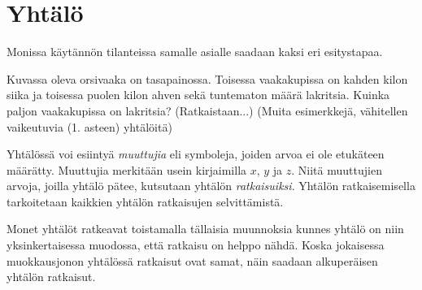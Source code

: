 \chapter{Yhtälö}
Monissa käytännön tilanteissa samalle asialle saadaan kaksi eri esitystapaa.

\begin{esimerkki}
Kuvassa oleva orsivaaka on tasapainossa. Toisessa vaakakupissa on kahden kilon siika ja toisessa puolen kilon ahven sekä tuntematon määrä lakritsia. Kuinka paljon vaakakupissa on lakritsia? (Ratkaistaan...) (Muita esimerkkejä, vähitellen vaikeutuvia (1. asteen) yhtälöitä)
\end{esimerkki}



Yhtälössä voi esiintyä \emph{muuttujia} eli symboleja, joiden arvoa ei ole etukäteen määrätty. Muuttujia merkitään usein kirjaimilla $x$, $y$ ja $z$. Niitä muuttujien arvoja, joilla yhtälö pätee, kutsutaan yhtälön \emph{ratkaisuiksi}. Yhtälön ratkaisemisella tarkoitetaan kaikkien yhtälön ratkaisujen selvittämistä.



Monet yhtälöt ratkeavat toistamalla tällaisia muunnoksia kunnes yhtälö on niin yksinkertaisessa muodossa, että ratkaisu on helppo nähdä. Koska jokaisessa muokkausjonon yhtälössä ratkaisut ovat samat, näin saadaan alkuperäisen yhtälön ratkaisut.

